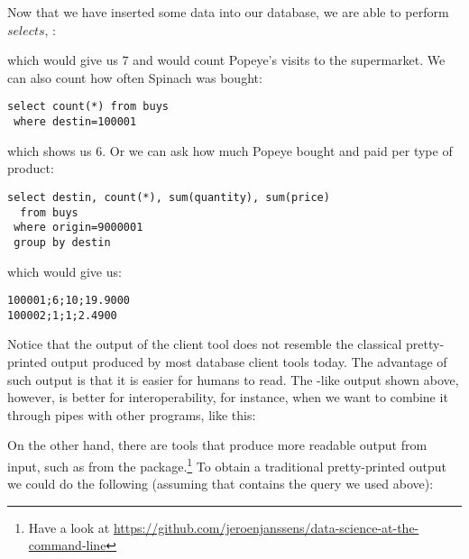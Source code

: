 Now that we have inserted some data
into our database, we are able to perform $selects$, \eg:


which would give us 7 and would count Popeye's visits to the supermarket.
We can also count how often Spinach was bought:

\begin{sqlcode}
\begin{lstlisting}
select count(*) from buys
 where destin=100001
\end{lstlisting}
\end{sqlcode}

which shows us 6.
Or we can ask how much Popeye bought and paid per type of product:

\begin{sqlcode}
\begin{lstlisting}
select destin, count(*), sum(quantity), sum(price)
  from buys
 where origin=9000001 
 group by destin
\end{lstlisting}
\end{sqlcode}

\begin{minipage}{\textwidth}
which would give us:
\begin{verbatim}
100001;6;10;19.9000
100002;1;1;2.4900
\end{verbatim}
\end{minipage}

Notice that the output
of the client tool does not resemble the classical
pretty-printed output produced by most database
client tools today. The advantage of such output is
that it is easier for humans to read.
The -like output shown above, however,
is better for interoperability, for instance,
when we want to combine it through pipes
with other programs, like this:


On the other hand, there are tools that
produce more readable output from  input,
such as  from the  package.\footnote{Have
a look at
\url{https://github.com/jeroenjanssens/data-science-at-the-command-line}}
To obtain a traditional pretty-printed output we could do the following
(assuming that  contains the query we used above):

